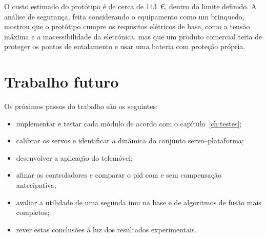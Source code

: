 O custo estimado do protótipo é de cerca de 143~€, dentro do limite definido. A análise de segurança, feita considerando o equipamento como um brinquedo, mostrou que o protótipo cumpre os requisitos elétricos de base, como a tensão máxima e a inacessibilidade da eletrónica, mas que um produto comercial teria de proteger os pontos de entalamento e usar uma bateria com proteção própria.

\section{Trabalho futuro}
Os próximos passos do trabalho são os seguintes:
\begin{itemize}
\item implementar e testar cada módulo de acordo com o capítulo~\ref{ch:testes};
\item calibrar os servos e identificar a dinâmica do conjunto servo--plataforma;
\item desenvolver a aplicação do telemóvel;
\item afinar os controladores e comparar o \gls{pid} com e sem compensação antecipativa;
\item avaliar a utilidade de uma segunda \gls{imu} na base e de algoritmos de fusão mais completos;
\item rever estas conclusões à luz dos resultados experimentais.
\end{itemize}

